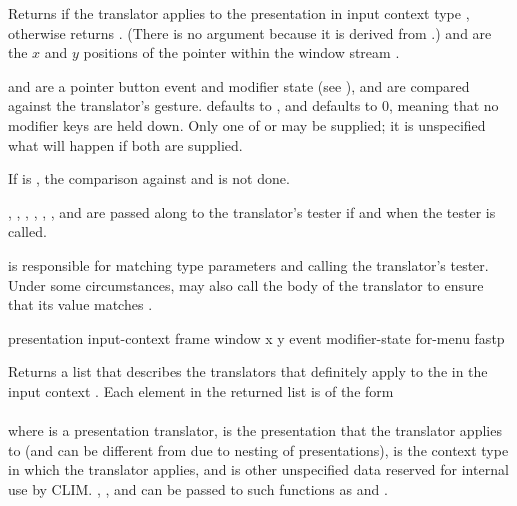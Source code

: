 Returns  if the translator  applies to the
presentation  in input context type ,
otherwise returns .  (There is no  argument because
it is derived from .)   and  are the $x$ and $y$
positions of the pointer within the window stream .

 and  are a pointer button event and modifier
state (see ), and are compared against the
translator's gesture.   defaults to , and
 defaults to 0, meaning that no modifier keys are held down.
Only one of  or  may be supplied; it is
unspecified what will happen if both are supplied.

If  is , the comparison against  and
 is not done.

, , , , ,
, and  are passed along to the translator's tester if and
when the tester is called.

 is responsible for matching type parameters
and calling the translator's tester.  Under some circumstances,
 may also call the body of the translator to
ensure that its value matches .


 {presentation input-context frame window x y
                                      \key event modifier-state for-menu fastp}

Returns a list that describes the translators that definitely apply to the
  in the input context .
Each element in the returned list is of the form
\\
\\
where  is a presentation translator,  is
the presentation that the translator applies to (and can be different from
 due to nesting of presentations),  is the
context type in which the translator applies, and  is other
unspecified data reserved for internal use by CLIM.  ,
, and  can be passed to such functions
as  and .

